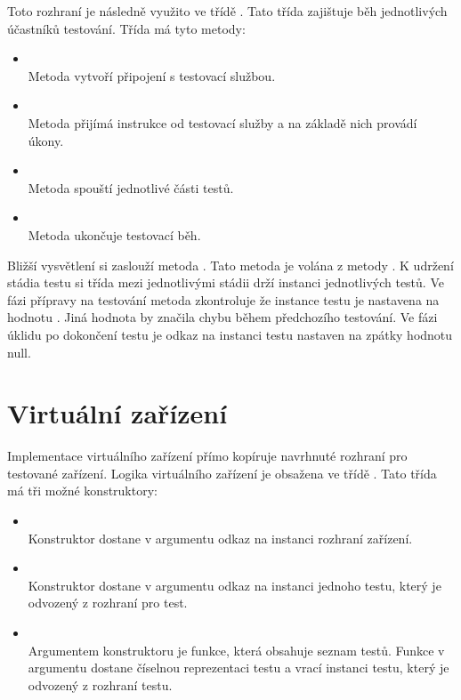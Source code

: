 Toto rozhraní je následně využito ve třídě . Tato třída zajištuje běh jednotlivých účastníků testování. Třída má tyto metody:

\begin{itemize}
    \item {} \\ Metoda vytvoří připojení s testovací službou.
    \item {} \\ Metoda přijímá instrukce od testovací služby a na základě nich provádí úkony.
    \item {} \\ Metoda spouští jednotlivé části testů. 
    \item {} \\ Metoda ukončuje testovací běh.
\end{itemize}

Bližší vysvětlení si zaslouží metoda . Tato metoda je volána z metody . K udržení stádia testu si třída mezi jednotlivými stádii drží instanci jednotlivých testů. Ve fázi přípravy na testování metoda zkontroluje že instance testu je nastavena na hodnotu . Jiná hodnota by značila chybu během předchozího testování. Ve fázi úklidu po dokončení testu je odkaz na instanci testu nastaven na zpátky hodnotu null. 

\section{Virtuální zařízení}
Implementace virtuálního zařízení přímo kopíruje navrhnuté rozhraní pro testované zařízení. Logika virtuálního zařízení je obsažena ve třídě . Tato třída má tři možné konstruktory:

\begin{itemize} 
    \item {} \\
    Konstruktor dostane v argumentu odkaz na instanci rozhraní zařízení.
    \item {} \\
    Konstruktor dostane v argumentu odkaz na instanci jednoho testu, který je odvozený z rozhraní pro test.
    \item {} \\
    Argumentem konstruktoru je funkce, která obsahuje seznam testů. Funkce v argumentu dostane číselnou reprezentaci testu a vrací instanci testu, který je odvozený z rozhraní testu.
\end{itemize}


